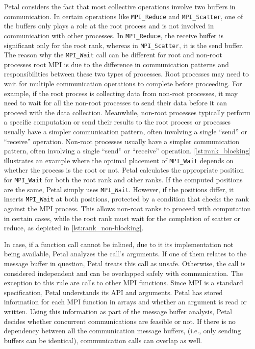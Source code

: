 \break

Petal considers the fact that most collective operations involve two buffers in communication. 
In certain operations like \texttt{MPI\_Reduce} and \texttt{MPI\_Scatter}, one of the buffers only plays a role at the root process and is not involved in communication with other processes. 
In \texttt{MPI\_Reduce}, the receive buffer is significant only for the root rank, whereas in \texttt{MPI\_Scatter}, it is the send buffer. 
The reason why the \texttt{MPI\_Wait} call can be different for root and non-root processes root MPI is due to the difference in communication patterns and responsibilities between these two types of processes.
Root processes may need to wait for multiple communication operations to complete before proceeding. For example, if the root process is collecting data from non-root processes, it may need to wait for all the non-root processes to send their data before it can proceed with the data collection. 
Meanwhile, non-root processes typically perform a specific computation or send their results to the root process or processes usually have a simpler communication pattern, often involving a single ``send'' or ``receive'' operation.
Non-root processes usually have a simpler communication pattern, often involving a single ``send'' or ``receive'' operation.
\autoref{lst:rank_blocking} illustrates an example where the optimal placement of \texttt{MPI\_Wait} depends on whether the process is the root or not. 
Petal calculates the appropriate position for \texttt{MPI\_Wait} for both the root rank and other ranks. 
If the computed positions are the same, Petal simply uses \texttt{MPI\_Wait}. However, if the positions differ, it inserts \texttt{MPI\_Wait} at both positions, protected by a condition that checks the rank against the MPI process. 
This allows non-root ranks to proceed with computation in certain cases, while the root rank must wait for the completion of scatter or reduce, as depicted in \autoref{lst:rank_non-blocking}.



In case, if a function call cannot be inlined, due to it its implementation not being available, Petal analyzes the call's arguments. 
If one of them relates to the message buffer in question, Petal treats this call as unsafe. 
Otherwise, the call is considered independent and can be overlapped safely with communication. 
The exception to this rule are calls to other MPI functions. Since MPI is a standard specification, Petal understands its API and arguments. 
Petal has stored information for each MPI function in arrays and whether an argument is read or written. 
Using this information as part of the message buffer analysis, Petal decides whether concurrent communications are feasible or not. 
If there is no dependency between all the communication message buffers, (i.e., only sending buffers can be identical), communication calls can overlap as well. 

